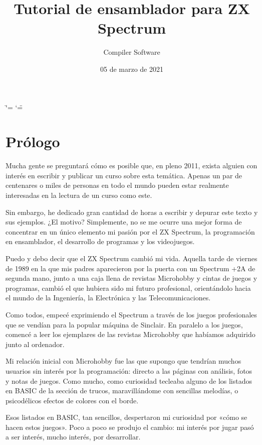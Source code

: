 \documentclass[letterpaper,10pt,spanish]{sphinxmanual}
\title{Tutorial de ensamblador para ZX Spectrum}
\date{05 de marzo de 2021}
\author{Compiler Software}
\begin{document}
\ifdefined\shorthandoff
  \ifnum\catcode`\=\string=\active\shorthandoff{=}\fi
  \ifnum\catcode`\"=\active{}\fi
\fi

\pagestyle{empty}
\sphinxmaketitle
\pagestyle{plain}
\sphinxtableofcontents
\pagestyle{normal}
\label{\detokenize{index::doc}}



\chapter{Prólogo}
\label{\detokenize{01_prologo/prologo:prologo}}\label{\detokenize{01_prologo/prologo::doc}}
Mucha gente se preguntará cómo es posible que, en pleno 2011, exista alguien con interés en escribir y publicar un curso sobre esta temática. Apenas un par de centenares o miles de personas en todo el mundo pueden estar realmente interesadas en la lectura de un curso como este.

Sin embargo, he dedicado gran cantidad de horas a escribir y depurar este texto y sus ejemplos. ¿El motivo? Simplemente, no se me ocurre una mejor forma de concentrar en un único elemento mi pasión por el ZX Spectrum, la programación en ensamblador, el desarrollo de programas y los videojuegos.

Puedo y debo decir que el ZX Spectrum cambió mi vida. Aquella tarde de viernes de 1989 en la que mis padres aparecieron por la puerta con un Spectrum +2A de segunda mano, junto a una caja llena de revistas Microhobby y cintas de juegos y programas, cambió el que hubiera sido mi futuro profesional, orientándolo hacia el mundo de la Ingeniería, la Electrónica y las Telecomunicaciones.

Como todos, empecé exprimiendo el Spectrum a través de los juegos profesionales que se vendían para la popular máquina de Sinclair. En paralelo a los juegos, comencé a leer los ejemplares de las revistas Microhobby que habíamos adquirido junto al ordenador.

Mi relación inicial con Microhobby fue las que supongo que tendrían muchos usuarios sin interés por la programación: directo a las páginas con análisis, fotos y notas de juegos. Como mucho, como curiosidad tecleaba alguno de los listados en BASIC de la sección de trucos, maravillándome con sencillas melodías, o psicodélicos efectos de colores con el borde.

Esos listados en BASIC, tan sencillos, despertaron mi curiosidad por «cómo se hacen estos juegos». Poco a poco se produjo el cambio: mi interés por jugar pasó a ser interés, mucho interés, por desarrollar.
\end{document}
